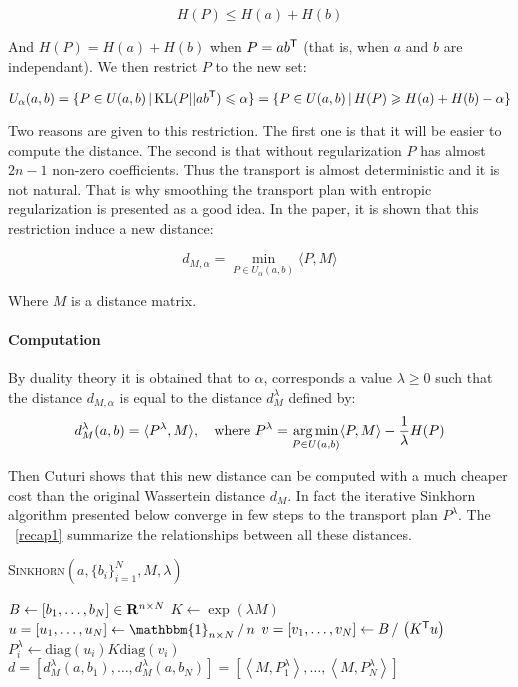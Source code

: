 $$ H(P) \leqslant H(a) + H(b) $$

And $H(P) = H(a) + H(b)$ when $P = a b^{\mathsf{T}}$ (that is, when $a$ and $b$ are independant).
We then restrict $P$ to the new set:

$$ U_\alpha(a, b) = \{ P \in U(a, b)
\, | \, \text{KL}(P || a b^{\mathsf{T}}) \leqslant \alpha \} = \{ P \in U(a, b)
\, | \, H(P) \geqslant H(a) + H(b) - \alpha \} $$

Two reasons are given to this restriction. The first one is that it will be
easier to compute the distance. The second is that without regularization
$P$ has almost $2n-1$ non-zero coefficients. Thus the transport is almost
deterministic and it is not natural. That is why smoothing the transport
plan with entropic regularization is presented as a good idea. In the paper,
it is shown that this restriction induce a new distance:

$$ d_{M, \alpha} = \min_{P \in U_\alpha(a,b)} \langle P, M \rangle $$

Where $M$ is a distance matrix.

\paragraph{Computation}
By duality theory it is obtained that to $\alpha$, corresponds a value
$\lambda \geqslant 0$ such that the distance $d_{M, \alpha}$ is equal to
the distance $d_M^\lambda$ defined by:
$$ d_M^\lambda(a, b) = \langle P^\lambda, M \rangle, \quad \text{where } P^\lambda = \operatorname*{arg\,min}_{P \in U(a, b)} \langle P, M \rangle - \dfrac{1}{\lambda} H(P) $$

Then Cuturi shows that this new distance can be computed with a much cheaper
cost than the original Wassertein distance $d_M$. In fact the iterative
Sinkhorn algorithm presented below converge in few steps to the transport
plan $P^\lambda$. The \figurename~\ref{recap1} summarize the relationships
between all these distances.

\vspace{3mm}

\begin{algorithm}[H]
	\caption{\textsc{Sinkhorn}$\left( a, \{ b_i \}_{i=1}^N, M, \lambda \right)$}
	$B \gets \left[ b_1, \dots, b_N \right] \in \mathbf{R}^{n \times N}$ \;
	$K \gets \exp \left( \lambda M \right)$ \;
	$u = \left[ u_1, \dots, u_N \right] \gets \mathbbm{1}_{n \times N} \, / \, n$ \;
	$v = \left[ v_1, \dots, v_N \right] \gets B \, / \, \left( K^{\mathsf{T}} u \right)$ \;
	$P^\lambda_i \gets \text{diag}(u_i) K \text{diag}(v_i)$ \;
	\Return $d = \left[ d_M^\lambda(a, b_1), \dots, d_M^\lambda(a, b_N) \right] = \left[ \left\langle M, P^\lambda_1 \right\rangle, \dots, \left\langle M, P^\lambda_N \right\rangle \right]$
\end{algorithm}
\vspace{3mm}

